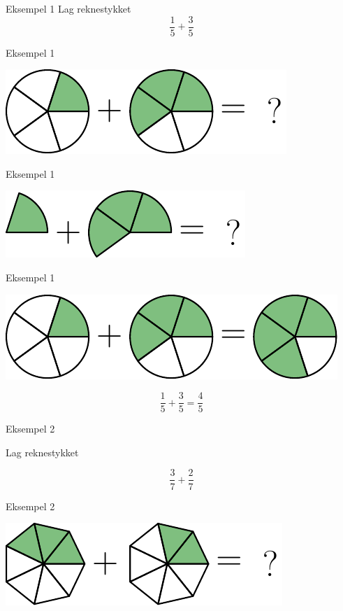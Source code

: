 \documentclass{beamer}
\begin{document}
\huge
\begin{frame}{Eksempel 1}
	\huge
	Lag reknestykket
	\huge
	\[ \frac{1}{5}+\frac{3}{5} \]
\end{frame}	

\begin{frame}{Eksempel 1}
\begin{center}
	\includegraphics{fig1a}
\end{center}
\end{frame}

\begin{frame}{Eksempel 1}
	\begin{center}
		\includegraphics{fig1b}
	\end{center}
\end{frame}

\begin{frame}{Eksempel 1}
	\begin{center}
		\includegraphics{fig1a2}
	\end{center}
\[ \frac{1}{5}+\frac{3}{5}=\frac{4}{5} \]
\end{frame}

\begin{frame}{Eksempel 2}

	Lag reknestykket
	
	\[ \frac{3}{7}+\frac{2}{7} \]
\end{frame}	

\begin{frame}{Eksempel 2}
	\begin{center}
		\includegraphics{fig2a}
	\end{center}
\end{frame}
\end{document}
